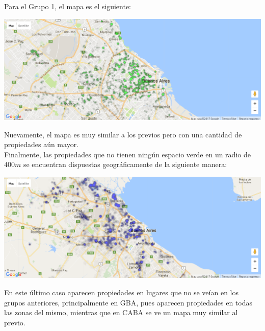 \documentclass[a4paper, 10pt]{article}
\newcommand\tab[1][0.5cm]{\hspace*{#1}}
\begin{document}
				\tab Para el Grupo 1, el mapa es el siguiente:
				\begin{center}
					\includegraphics[width=\textwidth]{images/parksGroup1}
				\end{center}
				\tab Nuevamente, el mapa es muy similar a los previos pero con una cantidad de propiedades aún mayor. \\
				\tab Finalmente, las propiedades que no tienen ningún espacio verde en un radio de $400m$ se encuentran
				dispuestas geográficamente de la siguiente manera:
				\begin{center}
					\includegraphics[width=\textwidth]{images/parksGroup0}
				\end{center}
				\tab En este último caso aparecen propiedades en lugares que no se veían en los grupos anteriores, principalmente
				en GBA, pues aparecen propiedades en todas las zonas del mismo, mientras que en CABA se ve un mapa muy similar al
				previo. \\
\end{document}
